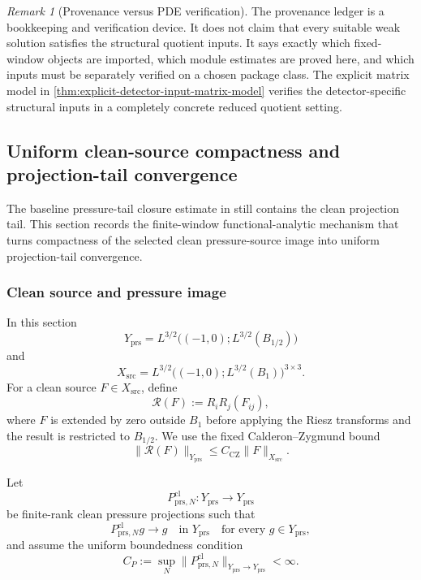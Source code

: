 \documentclass[11pt]{article}
\numberwithin{equation}{section}
\theoremstyle{definition}
\theoremstyle{remark}
\newtheorem{remark}[remark]{Remark}
\newcommand{\prs}{\mathrm{prs}}
\newcommand{\src}{\mathrm{src}}
\newcommand{\cl}{\mathrm{cl}}
\newcommand{\CZ}{\mathrm{CZ}}
\begin{document}
\begin{remark}[Provenance versus PDE verification]
The provenance ledger is a bookkeeping and verification device.  It does not claim that every suitable weak solution satisfies the structural quotient inputs.  It says exactly which fixed-window objects are imported, which module estimates are proved here, and which inputs must be separately verified on a chosen package class.  The explicit matrix model in \cref{thm:explicit-detector-input-matrix-model} verifies the detector-specific structural inputs in a completely concrete reduced quotient setting.
\end{remark}

\subsection{Uniform clean-source compactness and projection-tail convergence}
\label{sec:projection-tail-uniformity}

The baseline pressure-tail closure estimate in
 still contains the clean projection
tail.  This section records the finite-window functional-analytic mechanism
that turns compactness of the selected clean pressure-source image into
uniform projection-tail convergence.

\subsubsection{Clean source and pressure image}

In this section
\[
    Y_{\prs}
    =
    L^{3/2}\bigl((-1,0);L^{3/2}(B_{1/2})\bigr)
\]
and
\[
    X_{\src}
    =
    L^{3/2}\bigl((-1,0);L^{3/2}(B_1)\bigr)^{3\times 3}.
\]
For a clean source \(F\in X_{\src}\), define
\[
    \mathcal R(F)
    :=
    R_iR_j(F_{ij}),
\]
where \(F\) is extended by zero outside \(B_1\) before applying the Riesz
transforms and the result is restricted to \(B_{1/2}\).  We use the fixed
Calderon--Zygmund bound
\[
    \|\mathcal R(F)\|_{Y_{\prs}}
    \le
    C_{\CZ}\|F\|_{X_{\src}}.
\]

Let
\[
    P^{\cl}_{\prs,N}:Y_{\prs}\to Y_{\prs}
\]
be finite-rank clean pressure projections such that
\[
    P^{\cl}_{\prs,N}g\to g
    \quad\text{in }Y_{\prs}
    \quad\text{for every }g\in Y_{\prs},
\]
and assume the uniform boundedness condition
\[
    C_P:=\sup_N\|P^{\cl}_{\prs,N}\|_{Y_{\prs}\to Y_{\prs}}<\infty.
\]
\end{document}
